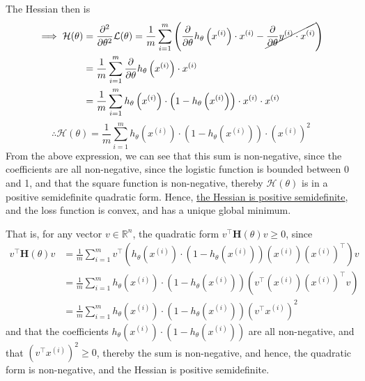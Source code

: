 The Hessian then is
\begin{align*}
    \implies
    \mathcal{H}(\theta)
     & =
    \frac{\partial^2}{\partial \theta^2} \mathcal{L}(\theta)
    =
    \frac{1}{m} \sum_{i=1}^{m}
    \left(
    \frac{\partial}{\partial \theta} h_{\theta}\left(x^{(i)}\right) \cdot x^{(i)}
    -
    \cancel{\frac{\partial}{\partial \theta} y^{(i)} \cdot x^{(i)}}
    \right)
    \\ & =
    \frac{1}{m} \sum_{i=1}^{m}
    \frac{\partial}{\partial \theta} h_{\theta}\left(x^{(i)}\right) \cdot x^{(i)}
    \\ & =
    \frac{1}{m} \sum_{i=1}^{m}
    h_{\theta}\left(x^{(i)}\right) \cdot \left(1-h_{\theta}\left(x^{(i)}\right)\right) \cdot x^{(i)} \cdot x^{(i)}
\end{align*}
\begin{equation*}
    \therefore
    \boxed{
        \mathcal{H}(\theta)
        =
        \frac{1}{m} \sum_{i=1}^{m}
        h_{\theta}\left(x^{(i)}\right) \cdot \left(1-h_{\theta}\left(x^{(i)}\right)\right)
        \cdot {\left(x^{(i)}\right)}^2
    }
\end{equation*}
From the above expression, we can see that this sum is non-negative, since the coefficients are all non-negative, since the logistic function is bounded between 0 and 1, and that the square function is non-negative, thereby \( \mathcal{H}(\theta) \) is in a positive semidefinite quadratic form.
Hence, \underline{the Hessian is positive semidefinite}, and the loss function is convex, and has a unique global minimum.

That is, for any vector \( v \in \mathbb{R}^n \), the quadratic form \( v^\top \mathbf{H}(\theta) v \geq 0 \), since
\begin{align*}
    v^\top \mathbf{H}(\theta) v
     & =
    \frac{1}{m} \sum_{i=1}^{m}
    v^\top
    \left(
    h_{\theta}\left(x^{(i)}\right) \cdot \left(1-h_{\theta}\left(x^{(i)}\right)\right)
    \left(x^{(i)}\right) {\left(x^{(i)}\right)}^\top
    \right)
    v
    \\ & =
    \frac{1}{m} \sum_{i=1}^{m}
    h_{\theta}\left(x^{(i)}\right) \cdot \left(1-h_{\theta}\left(x^{(i)}\right)\right)
    \left(
    v^\top
    \left(x^{(i)}\right)
    {{\left(x^{(i)}\right)}^\top}
    v
    \right)
    \\ & =
    \frac{1}{m} \sum_{i=1}^{m}
    h_{\theta}\left(x^{(i)}\right) \cdot \left(1-h_{\theta}\left(x^{(i)}\right)\right)
    {\left(v^\top x^{(i)}\right)}^2
\end{align*}
and that the coefficients \( h_{\theta}\left(x^{(i)}\right) \cdot \left(1-h_{\theta}\left(x^{(i)}\right)\right) \) are all non-negative, and that \( {\left(v^\top x^{(i)}\right)}^2 \geq 0 \), thereby the sum is non-negative, and hence, the quadratic form is non-negative, and the Hessian is positive semidefinite.
